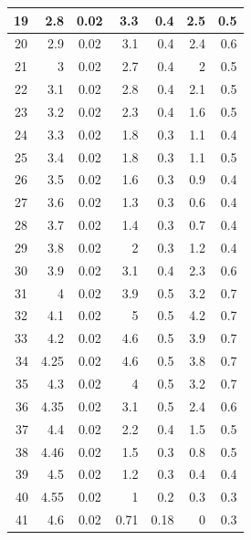 \documentclass{article}
\begin{document}
\begin{table}[h!]
\begin{tabular}{|c|r|c|r|r|r|r|}
19                       & 2.8  & 0.02 & 3.3  & 0.4  & 2.5  & 0.5 \\ \hline
20                       & 2.9  & 0.02 & 3.1  & 0.4  & 2.4  & 0.6 \\ \hline
21                       & 3    & 0.02 & 2.7  & 0.4  & 2    & 0.5 \\ \hline
22                       & 3.1  & 0.02 & 2.8  & 0.4  & 2.1  & 0.5 \\ \hline
23                       & 3.2  & 0.02 & 2.3  & 0.4  & 1.6  & 0.5 \\ \hline
24                       & 3.3  & 0.02 & 1.8  & 0.3  & 1.1  & 0.4 \\ \hline
25                       & 3.4  & 0.02 & 1.8  & 0.3  & 1.1  & 0.5 \\ \hline
26                       & 3.5  & 0.02 & 1.6  & 0.3  & 0.9  & 0.4 \\ \hline
27                       & 3.6  & 0.02 & 1.3  & 0.3  & 0.6  & 0.4 \\ \hline
28                       & 3.7  & 0.02 & 1.4  & 0.3  & 0.7  & 0.4 \\ \hline
29                       & 3.8  & 0.02 & 2    & 0.3  & 1.2  & 0.4 \\ \hline
30                       & 3.9  & 0.02 & 3.1  & 0.4  & 2.3  & 0.6 \\ \hline
31                       & 4    & 0.02 & 3.9  & 0.5  & 3.2  & 0.7 \\ \hline
32                       & 4.1  & 0.02 & 5    & 0.5  & 4.2  & 0.7 \\ \hline
33                       & 4.2  & 0.02 & 4.6  & 0.5  & 3.9  & 0.7 \\ \hline
\multicolumn{1}{|r|}{34} & 4.25 & 0.02 & 4.6  & 0.5  & 3.8  & 0.7 \\ \hline
\multicolumn{1}{|r|}{35} & 4.3  & 0.02 & 4    & 0.5  & 3.2  & 0.7 \\ \hline
\multicolumn{1}{|r|}{36} & 4.35 & 0.02 & 3.1  & 0.5  & 2.4  & 0.6 \\ \hline
\multicolumn{1}{|r|}{37} & 4.4  & 0.02 & 2.2  & 0.4  & 1.5  & 0.5 \\ \hline
\multicolumn{1}{|r|}{38} & 4.46 & 0.02 & 1.5  & 0.3  & 0.8  & 0.5 \\ \hline
\multicolumn{1}{|r|}{39} & 4.5  & 0.02 & 1.2  & 0.3  & 0.4  & 0.4 \\ \hline
\multicolumn{1}{|r|}{40} & 4.55 & 0.02 & 1    & 0.2  & 0.3  & 0.3 \\ \hline
\multicolumn{1}{|r|}{41} & 4.6  & 0.02 & 0.71 & 0.18 & 0    & 0.3 \\ \hline

\end{tabular}
\end{table}
\end{document}

